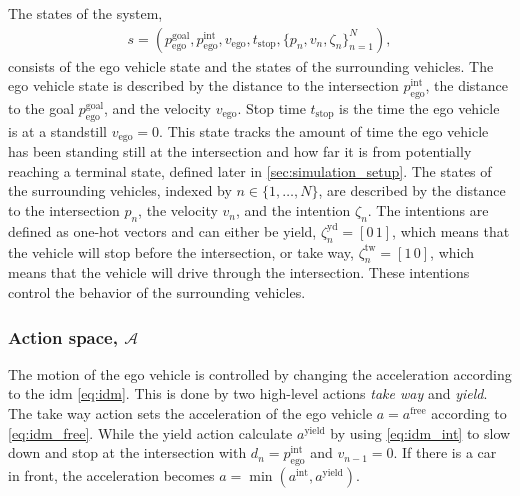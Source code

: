 The states of the system,
\begin{align}
    s = (p_\mathrm{ego}^\mathrm{goal},p_\mathrm{ego}^\mathrm{int}, v_\mathrm{ego}, t_\mathrm{stop}, \{p_{n}, v_n, \zeta_n\}_{n=1}^N),
    \label{eq:state}
\end{align}
consists of the ego vehicle state and the states of the surrounding vehicles. The ego vehicle state is described by the distance to the intersection $p_\mathrm{ego}^\mathrm{int}$, the distance to the goal $p_\mathrm{ego}^\mathrm{goal}$, and the velocity $v_\mathrm{ego}$. Stop time $t_\mathrm{stop}$ is the time the ego vehicle is at a standstill $v_\mathrm{ego}=0$. This state tracks the amount of time the ego vehicle has been standing still at the intersection and how far it is from potentially reaching a terminal state, defined later in \ref{sec:simulation_setup}. The states of the surrounding vehicles, indexed by $n \in \{1, \ldots, N\}$, are described by the distance to the intersection $p_{n}$, the velocity $v_n$, and the intention $\zeta_n$. The intentions are defined as one-hot vectors and can either be yield, $\zeta_n^\mathrm{yd} = [0 \, 1]$, which means that the vehicle will stop before the intersection, or take way, $\zeta_n^\mathrm{tw}= [1 \, 0]$, which means that the vehicle will drive through the intersection. These intentions control the behavior of the surrounding vehicles.


\subsubsection{Action space, $\mathcal{A}$}
\label{sec:action}
The motion of the ego vehicle is controlled by changing the acceleration according to the \gls{idm} \eqref{eq:idm}. This is done by two high-level actions \textit{take way} and \textit{yield}. The take way action sets the acceleration of the ego vehicle $a=a^\mathrm{free}$ according to \eqref{eq:idm_free}. While the yield action calculate $a^\mathrm{yield}$ by using \eqref{eq:idm_int} to slow down and stop at the intersection with $d_n = p_\mathrm{ego}^\mathrm{int}$ and $v_{n-1}=0$. If there is a car in front, the acceleration becomes $a=\min(a^\mathrm{int},a^\mathrm{yield})$. 

